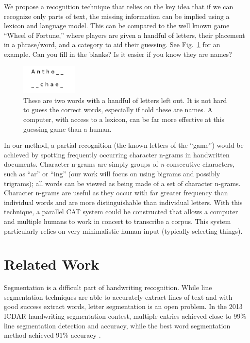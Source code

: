 \documentclass[ms]{byuprop}
\begin{document}
We propose a recognition technique that relies on the key idea that if we can recognize only parts of text, the missing information can be implied using a lexicon and language model. This can be compared to the well known game ``Wheel of Fortune,'' where players are given a handful of letters, their placement in a phrase/word, and a category to aid their guessing. See Fig.~\ref{fig:wheel_of_fortune_example} for an example. Can you fill in the blanks? Is it easier if you know they are names?

\begin{figure}
    \centering
    \includegraphics[width=0.25\textwidth]{wheel_of_fortune_example}
    \caption{These are two words with a handful of letters left out. It is not hard to guess the correct words, especially if told these are names. A computer, with access to a lexicon, can be far more effective at this guessing game than a human.}
    \label{fig:wheel_of_fortune_example}
\end{figure}

In our method, a partial recognition (the known letters of the ``game'') would be achieved by spotting frequently occurring character n-grams in handwritten documents. Character n-grams are simply groups of \textit{n} consecutive characters, such as ``ar'' or ``ing'' (our work will focus on using bigrams and possibly trigrams); all words can be viewed as being made of a set of character n-grams. Character n-grams are useful as they occur with far greater frequency than individual words and are more distinguishable than individual letters. With this technique, a parallel CAT system could be constructed that allows a computer and multiple humans to work in concert to transcribe a corpus. This system particularly relies on very minimalistic human input (typically selecting things).




\section{Related Work}


Segmentation is a difficult part of handwriting recognition. While line segmentation techniques are able to accurately extract lines of text and with good success extract words, letter segmentation is an open problem. In the 2013 ICDAR handwriting segmentation contest, multiple entries achieved close to 99\% line segmentation detection and accuracy, while the best word segmentation method achieved 91\% accuracy \cite{icdar_segmentation2013}.
\end{document}
